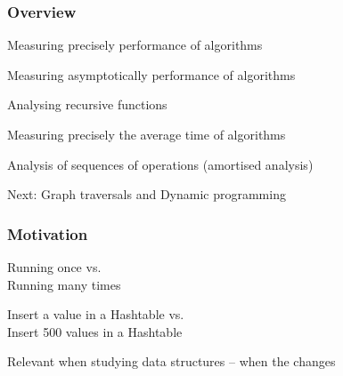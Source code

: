 \documentclass[aspectratio=169]{beamer}
\begin{document}
\frame[plain]{\titlepage}


\begin{frame}[t]\frametitle{Overview}


  \begin{itemize}
    {\color{black!25}
    \item Measuring {precisely} performance of algorithms
    \item Measuring {asymptotically} performance of algorithms
    \item Analysing {recursive} functions
    \item Measuring {precisely} the {average time} of algorithms}
    \item Analysis of sequences of operations (\alert{amortised analysis})
    {\color{black!25}
    \item Next: Graph traversals and Dynamic programming
    }
  \end{itemize}
\end{frame}


\begin{frame}\frametitle{Motivation}
  \centering

  \begin{block}{}
    Running once \alert{vs.}\\
    Running many times
  \end{block}

  \begin{block}{}
    Insert a value in a Hashtable \alert{vs.}\\
    Insert 500 values in a Hashtable
  \end{block}

  \bigskip
  {\Large Relevant when studying data structures -- when the  changes}


\end{frame}



\end{document}
